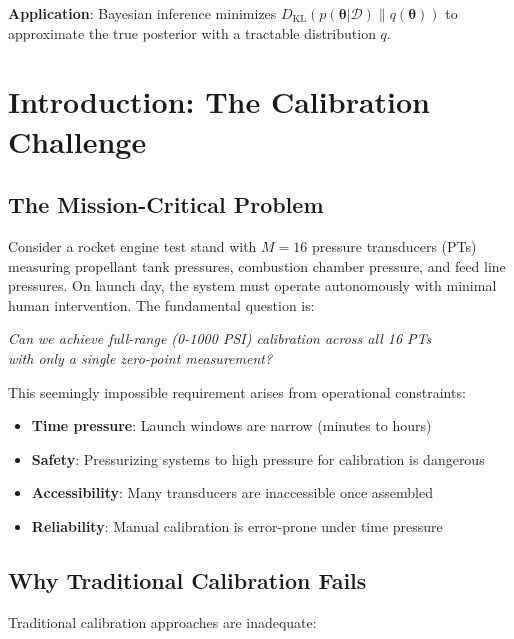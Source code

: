 \documentclass[11pt]{article}
\begin{document}
\textbf{Application}: Bayesian inference minimizes $D_{\text{KL}}(p(\bm{\theta}|\mathcal{D}) \| q(\bm{\theta}))$ to approximate the true posterior with a tractable distribution $q$.

\section{Introduction: The Calibration Challenge}

\subsection{The Mission-Critical Problem}

Consider a rocket engine test stand with $M = 16$ pressure transducers (PTs) measuring propellant tank pressures, combustion chamber pressure, and feed line pressures. On launch day, the system must operate autonomously with minimal human intervention. The fundamental question is:

\begin{center}
\emph{Can we achieve full-range (0-1000 PSI) calibration across all 16 PTs \\
with only a single zero-point measurement?}
\end{center}

This seemingly impossible requirement arises from operational constraints:
\begin{itemize}
\item \textbf{Time pressure}: Launch windows are narrow (minutes to hours)
\item \textbf{Safety}: Pressurizing systems to high pressure for calibration is dangerous
\item \textbf{Accessibility}: Many transducers are inaccessible once assembled
\item \textbf{Reliability}: Manual calibration is error-prone under time pressure
\end{itemize}

\subsection{Why Traditional Calibration Fails}

Traditional calibration approaches are inadequate:
\end{document}
